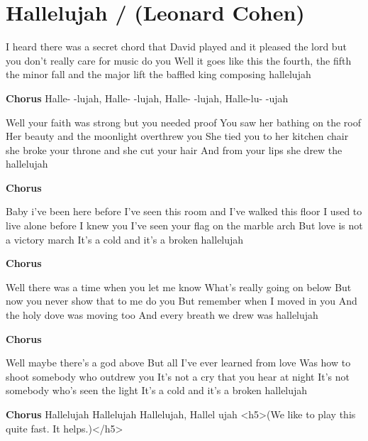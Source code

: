 \section{Hallelujah / (Leonard Cohen)}\label{sec:hallelujah}

                    

I heard there was a secret chord
that David played and it pleased the lord
but you don't really care for music do you 
Well it goes like this the fourth, the fifth
the minor fall and the major lift
the baffled king composing hallelujah

\textbf{Chorus}
Halle- -lujah, Halle- -lujah, Halle- -lujah,
Halle-lu- -ujah
                           

Well your faith was strong but you needed proof
You saw her bathing on the roof
Her beauty and the moonlight overthrew you 
She tied you to her kitchen chair
she broke your throne and she cut your hair
And from your lips she drew the hallelujah

\textbf{Chorus}

Baby i've been here before
I've seen this room and I've walked this floor
I used to live alone before I knew you 
I've seen your flag on the marble arch
But love is not a victory march
It's a cold and it's a broken hallelujah

\textbf{Chorus}

Well there was a time when you let me know
What's really going on below
But now you never show that to me do you 
But remember when I moved in you
And the holy dove was moving too
And every breath we drew was hallelujah

\textbf{Chorus}

Well maybe there's a god above
But all I've ever learned from love
Was how to shoot somebody who outdrew you 
It's not a cry that you hear at night
It's not somebody who's seen the light
It's a cold and it's a broken hallelujah

\textbf{Chorus}
Hallelujah Hallelujah Hallelujah, Hallel
ujah 
<h5>(We like to play this quite fast. It helps.)</h5>

